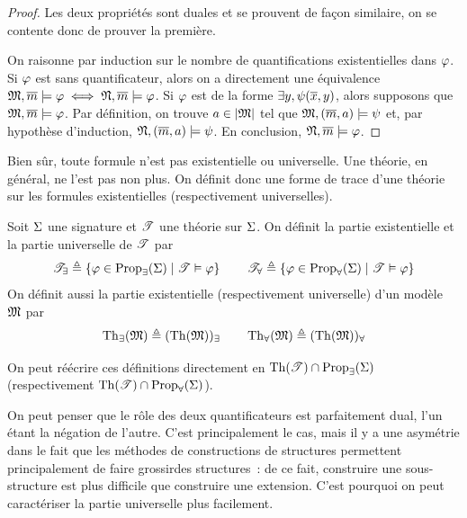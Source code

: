 \begin{proof}
  Les deux propriétés sont duales et se prouvent de façon similaire, on se
  contente donc de prouver la première.

  On raisonne par induction sur le nombre de quantifications existentielles
  dans $\varphi$. Si $\varphi$ est sans quantificateur, alors on a directement
  une équivalence $\mathfrak{M},\overline{m}\models\varphi\iff\mathfrak{N},\overline{m}\models\varphi$.
  Si $\varphi$ est de la forme $\exists y,\psi(\overline{x},y)$, alors supposons
  que $\mathfrak{M},\overline{m} \models\varphi$. Par définition, on trouve $a\in\left\vert \mathfrak{M}\right\vert$
  tel que $\mathfrak{M},(\overline{m},a)\models\psi$ et, par hypothèse d'induction,
  $\mathfrak{N},(\overline{m},a)\models\psi$. En conclusion, $\mathfrak{N},\overline{m}\models\varphi$.
\end{proof}

Bien sûr, toute formule n'est pas existentielle ou universelle. Une théorie, en
général, ne l'est pas non plus. On définit donc une forme de trace d'une théorie
sur les formules existentielles (respectivement universelles).

\begin{definition}
  Soit $\Sigma$ une signature et $\mathscr T$ une théorie sur $\Sigma$. On définit
  la partie existentielle et la partie universelle de $\mathscr T$ par
  \[\mathscr T_{\exists} \triangleq
  \left\{ \varphi\in\operatorname{Prop}_{\exists}(\Sigma) \;\middle\vert\; \mathscr T\vDash\varphi \right\}
  \qquad
  \mathscr T_{\forall} \triangleq
  \left\{ \varphi\in\operatorname{Prop}_{\forall}(\Sigma) \;\middle\vert\; \mathscr T\vDash\varphi \right\}\]
  On définit aussi la partie existentielle (respectivement universelle) d'un
  modèle $\mathfrak{M}$ par
  \[\operatorname{Th}_{\exists}(\mathfrak{M})\triangleq(\operatorname{Th}(\mathfrak{M}))_{\exists}\qquad
  \operatorname{Th}_{\forall}(\mathfrak{M})\triangleq(\operatorname{Th}(\mathfrak{M}))_{\forall}\]
  \index[notation]{$\varT_{\exists}$}
  \index[notation]{$\varT_{\forall}$}
  \index[notation]{$\Th_{\exists}(\varMM)$}
  \index[notation]{$\Th_{\forall}(\varMM)$}
\end{definition}

\begin{remark}
  On peut réécrire ces définitions directement en
  $\operatorname{Th}(\mathscr T)\cap\operatorname{Prop}_{\exists}(\Sigma)$ (respectivement
  $\operatorname{Th}(\mathscr T)\cap\operatorname{Prop}_{\forall}(\Sigma)$).
\end{remark}

On peut penser que le rôle des deux quantificateurs est parfaitement dual,
l'un étant la négation de l'autre. C'est principalement le cas, mais il y a une
asymétrie dans le fait que les méthodes de constructions de structures
permettent principalement de \og faire grossir\fg des structures~: de ce fait,
construire une sous-structure est plus difficile que construire une extension.
C'est pourquoi on peut caractériser la partie universelle plus facilement.

